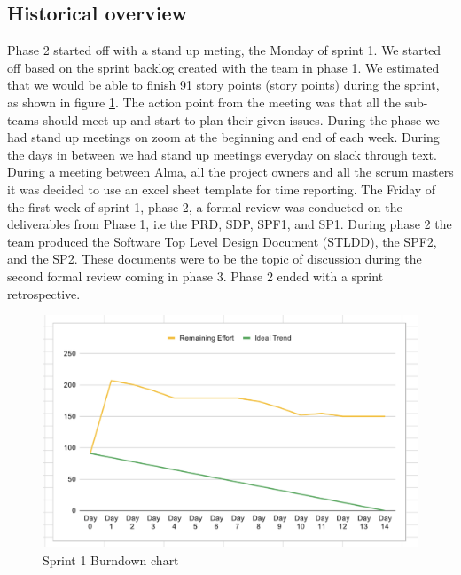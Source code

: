 \documentclass{article}
\begin{document}
\subsection{Historical overview}
Phase 2 started off with a stand up meting, the Monday of sprint 1. We started off based on the sprint backlog created with the team in phase 1. We estimated that we would be able to finish 91 story points (story points) during the sprint, as shown in figure \ref{fig:Burndown1}. The action point from the meeting was that all the sub-teams should meet up and start to plan their given issues. During the phase we had stand up meetings on zoom at the beginning and end of each week. During the days in between we had stand up meetings everyday on slack through text. During a meeting between Alma, all the project owners and all the scrum masters it was decided to use an excel sheet template for time reporting. The Friday of the first week of  sprint 1, phase 2, a formal review was conducted on the deliverables from Phase 1, i.e the PRD, SDP, SPF1, and SP1. During phase 2 the team produced the Software Top Level Design Document (STLDD), the SPF2, and the SP2. These documents were to be the topic of discussion during the second formal review coming in phase 3. Phase 2 ended with a sprint retrospective.

\begin{figure}[h!]
    \centering
    \includegraphics[scale=0.6]{pfrFigures/Sprint1.png}
    \caption{Sprint 1 Burndown chart}
    \label{fig:Burndown1}
\end{figure}
\end{document}
